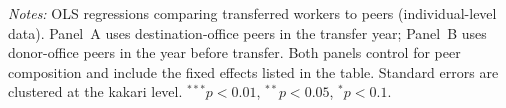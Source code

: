 \begin{table}[p]
\begin{threeparttable}
\begin{tablenotes}[flushleft]
\scriptsize
\item \textit{Notes:} OLS regressions comparing transferred workers to peers (individual-level data). Panel~A uses destination-office peers in the transfer year; Panel~B uses donor-office peers in the year before transfer. Both panels control for peer composition and include the fixed effects listed in the table. Standard errors are clustered at the kakari level. $^{***}p<0.01$, $^{**}p<0.05$, $^{*}p<0.1$.
\end{tablenotes}
\end{threeparttable}
\end{table}
